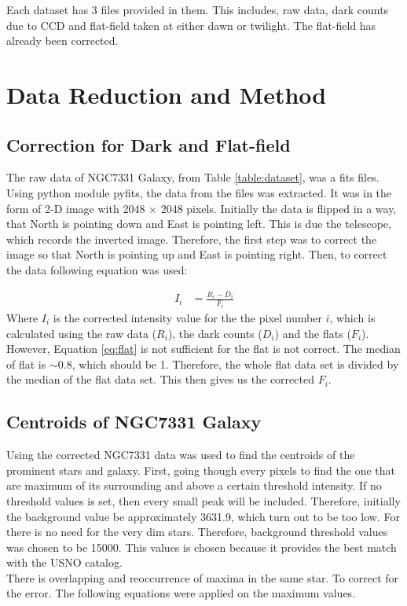 \documentclass[a4paper,12pt]{article}
\begin{document}
Each dataset has 3 files provided in them. This includes, raw data, dark counts due to CCD and flat-field taken at either dawn or twilight. The flat-field has already been corrected. 
\section{Data Reduction and Method}
\label{sec:reduction}

\subsection{Correction for Dark and Flat-field}
\label{sec:dark}
The raw data of NGC7331 Galaxy, from Table \ref{table:dataset}, was a fits files. Using python module pyfits, the data from the files was extracted. It was in the form of 2-D image with 2048 $\times$ 2048 pixels. Initially the data is flipped in a way, that North is pointing down and East is pointing left. This is due the telescope, which records the inverted image. Therefore, the first step was to correct the image so that North is pointing up and East is pointing right. Then, to correct the data following equation was used:

\begin{equation}
\label{eq:flat}
\begin{array}{rcl}
    I_i &= \frac{R_i - D_i}{F_i} 
\end{array}
\end{equation}
Where $I_i$ is the corrected intensity value for the the pixel number $i$, which is calculated using the raw data ($R_i$), the dark counts ($D_i$) and the flats ($F_i$). However, Equation \ref{eq:flat} is not sufficient for the flat is not correct. The median of flat is $\sim$0.8, which should be 1. Therefore, the whole flat data set is divided by the median of the flat data set. This then gives us the corrected $F_i$.   

\subsection{Centroids of NGC7331 Galaxy}
\label{sec:centroid}
Using the corrected NGC7331 data was used to find the centroids of the prominent stars and galaxy. First, going though every pixels to find the one that are maximum of its surrounding and above a certain threshold intensity. If no threshold values is set, then every small peak will be included. Therefore, initially the background value be approximately 3631.9, which turn out to be too low. For there is no need for the very dim stars. Therefore, background threshold values was chosen to be 15000. This values is chosen because it provides the best match with the USNO catalog. \\
\indent There is overlapping and reoccurrence of maxima in the same star. To correct for the error. The following equations were applied on the maximum values. 
\end{document}

